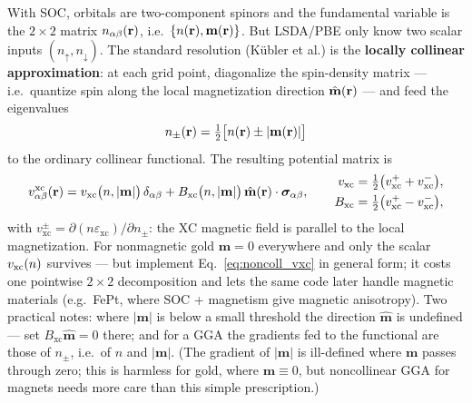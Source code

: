 With SOC, orbitals are two-component spinors and the fundamental variable is
the $2\times2$ matrix $n_{\alpha\beta}(\mathbf{r})$, i.e.\ $\{n(\mathbf{r}),
\mathbf{m}(\mathbf{r})\}$. But LSDA/PBE only know two scalar inputs
$(n_\uparrow, n_\downarrow)$. The standard resolution (K\"ubler et al.) is
the \textbf{locally collinear approximation}: at each grid point,
diagonalize the spin-density matrix --- i.e.\ quantize spin along the local
magnetization direction $\hat{\mathbf m}(\mathbf{r})$ --- and feed the eigenvalues
\begin{equation}
n_{\pm}(\mathbf{r}) = \tfrac12\big[n(\mathbf{r}) \pm |\mathbf{m}(\mathbf{r})|\big]
\end{equation}
to the ordinary collinear functional. The resulting potential matrix is
\begin{equation}
v^{\mathrm{xc}}_{\alpha\beta}(\mathbf{r})
= v_{\mathrm{xc}}\big(n, |\mathbf m|\big)\,\delta_{\alpha\beta}
+ B_{\mathrm{xc}}\big(n, |\mathbf m|\big)\,
\hat{\mathbf m}(\mathbf{r})\cdot \bm\sigma_{\alpha\beta},
\qquad
\begin{aligned}
v_{\mathrm{xc}} &= \tfrac12\big(v^{+}_{\mathrm{xc}} + v^{-}_{\mathrm{xc}}\big),\\
B_{\mathrm{xc}} &= \tfrac12\big(v^{+}_{\mathrm{xc}} - v^{-}_{\mathrm{xc}}\big),
\end{aligned}
\label{eq:noncoll_vxc}
\end{equation}
with $v^{\pm}_{\mathrm{xc}} = \partial (n\varepsilon_{\mathrm{xc}})/\partial
n_\pm$: the XC magnetic field is parallel to the local magnetization. For
nonmagnetic gold $\mathbf m = 0$ everywhere and only the scalar $v_{\mathrm{xc}}(n)$
survives --- but implement Eq.~\eqref{eq:noncoll_vxc} in general form; it
costs one pointwise $2\times2$ decomposition and lets the same code later
handle magnetic materials (e.g.\ FePt, where SOC + magnetism give magnetic
anisotropy). Two practical notes: where $|\mathbf m|$ is below a small
threshold the direction $\hat{\mathbf m}$ is undefined --- set
$B_{\mathrm{xc}}\hat{\mathbf m} = 0$ there; and for a GGA the gradients
fed to the functional are those of $n_\pm$, i.e.\ of $n$ and
$|\mathbf m|$. (The gradient of $|\mathbf m|$ is ill-defined where
$\mathbf m$ passes through zero; this is harmless for gold, where
$\mathbf m \equiv 0$, but noncollinear GGA for magnets needs more care
than this simple prescription.)

